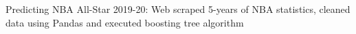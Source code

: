 

\begin{cvskills}

  \cvskill
    {Predicting NBA All-Star 2019-20:} %
    {Web scraped 5-years of NBA statistics, cleaned data using Pandas and executed boosting tree algorithm} %
    
\end{cvskills}
